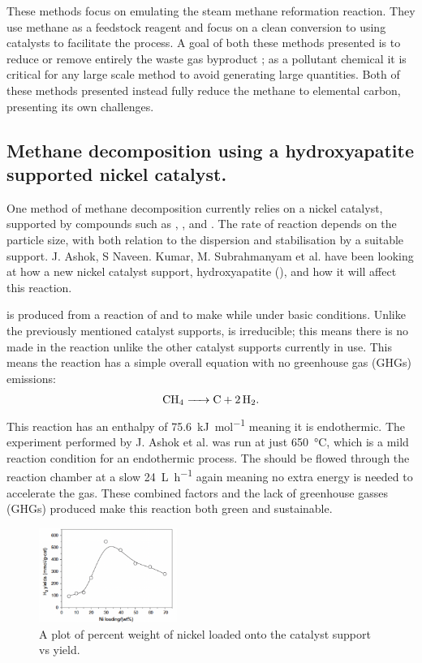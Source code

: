 These methods focus on emulating the steam methane reformation reaction. 
They use methane as a feedstock reagent and focus on a clean conversion to  using catalysts to facilitate the process.
A goal of both these methods presented is to reduce or remove entirely the waste gas byproduct ; as a pollutant chemical it is critical for any large scale method to avoid generating large quantities.
Both of these methods presented instead fully reduce the methane to elemental carbon, presenting its own challenges.

\subsection{Methane decomposition using a hydroxyapatite supported nickel catalyst.}%
\label{sub:methane_decomposition_using_a_hydroxyapatite_supported_nickel_catalyst_}
One method of methane decomposition currently relies on a nickel catalyst, supported by compounds such as , ,  and .
The rate of reaction depends on the  particle size, with both relation to the dispersion and stabilisation by a suitable support\cite{Ashok}.
 J. Ashok, S Naveen. Kumar, M. Subrahmanyam et al. have been looking at how a new nickel catalyst support, hydroxyapatite (), and how it will affect this reaction.

  is produced from a reaction of  and  to make \ce{[Ca5(PO4)3(OH)]} while under basic conditions\cite{Ashok}.
Unlike the previously mentioned catalyst supports,  is irreducible; this means there is no  made in the reaction unlike the other catalyst supports currently in use.
This means the reaction has a simple overall equation with no greenhouse gas (GHGs) emissions:
\begin{align}
	\ce{CH4 -> C +2H2}
.\end{align}
This reaction has an enthalpy of \SI{75.6}{\kilo\joule\per\mole} meaning it is endothermic.
The experiment performed by J. Ashok et al. was run at just \SI{650}{\celsius}\cite{Ashok}, which is a mild reaction condition for an endothermic process.
The  should be flowed through the reaction chamber at a slow \SI{24}{\liter\per\hour}\cite{Ashok} again meaning no extra energy is needed to accelerate the gas.
These combined factors and the lack of greenhouse gasses (GHGs) produced make this reaction both green and sustainable.

\begin{figure}[H]
	\centering
	\includegraphics[width=0.4\textwidth]{539a7840-2cb8-11eb-895f-8c8590753a48.png}
	\caption{A plot of percent weight of nickel loaded onto the catalyst support vs  yield.}  
	\label{fig:MD_plot1}
\end{figure}

